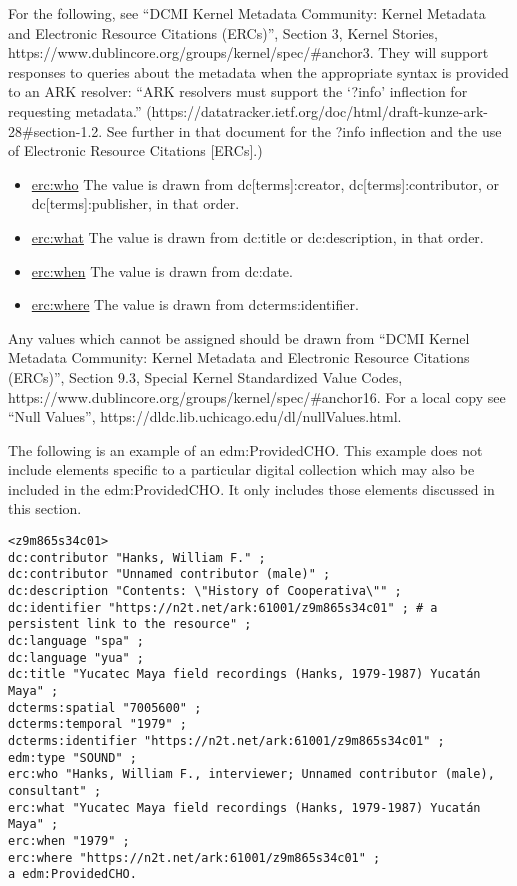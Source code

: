 \documentclass[11pt]{article}
\begin{document}
For the following, see ``DCMI Kernel Metadata Community: Kernel Metadata and Electronic Resource Citations (ERCs)'', Section 3, Kernel Stories, https://www.dublincore.org/groups/kernel/spec/\#anchor3. They will support responses to queries about the metadata when the appropriate syntax is provided to an ARK resolver: ``ARK resolvers must support the `?info' inflection for requesting metadata.'' (https://datatracker.ietf.org/doc/html/draft-kunze-ark-28\#section-1.2. See further in that document for the ?info inflection and the use of Electronic Resource Citations [ERCs].)

\begin{itemize}
\item \underline{erc:who} The value is drawn from dc[terms]:creator, dc[terms]:contributor, or dc[terms]:publisher, in that order.
\item \underline{erc:what} The value is drawn from dc:title or dc:description, in that order.
\item \underline{erc:when} The value is drawn from dc:date.
\item \underline{erc:where} The value is drawn from dcterms:identifier.
\end{itemize}

Any values which cannot be assigned should be drawn from ``DCMI Kernel Metadata Community: Kernel Metadata and Electronic Resource Citations (ERCs)'', Section 9.3, Special Kernel Standardized Value Codes, https://www.dublincore.org/groups/kernel/spec/\#anchor16. For a local copy see ``Null Values'', https://dldc.lib.uchicago.edu/dl/nullValues.html.

The following is an example of an edm:ProvidedCHO. This example does not include elements specific to a particular digital collection which may also be included in the edm:ProvidedCHO. It only includes those elements discussed in this section.

\begin{verbatim}
<z9m865s34c01>
dc:contributor "Hanks, William F." ;
dc:contributor "Unnamed contributor (male)" ;
dc:description "Contents: \"History of Cooperativa\"" ;
dc:identifier "https://n2t.net/ark:61001/z9m865s34c01" ; # a persistent link to the resource" ;
dc:language "spa" ;
dc:language "yua" ;
dc:title "Yucatec Maya field recordings (Hanks, 1979-1987) Yucatán Maya" ;
dcterms:spatial "7005600" ;
dcterms:temporal "1979" ;
dcterms:identifier "https://n2t.net/ark:61001/z9m865s34c01" ;
edm:type "SOUND" ;
erc:who "Hanks, William F., interviewer; Unnamed contributor (male), consultant" ;
erc:what "Yucatec Maya field recordings (Hanks, 1979-1987) Yucatán Maya" ;
erc:when "1979" ;
erc:where "https://n2t.net/ark:61001/z9m865s34c01" ;
a edm:ProvidedCHO.
\end{verbatim}
\end{document}
